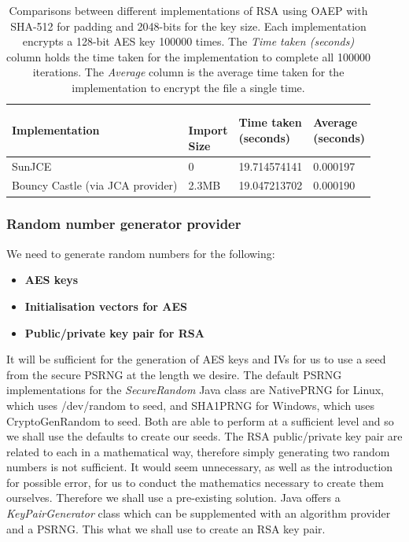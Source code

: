 \documentclass[12pt, titlepage]{article}
\begin{document}
\begin{center}
\begin{table}[H]
    \begin{tabular}{ | l | l | l | l |}
    \hline
    \textbf{Implementation} & \shortstack{ \\ \textbf{Import} \\ \textbf{Size}} & \shortstack{\textbf{Time taken} \\ \textbf{(seconds)}} & \shortstack{\textbf{Average} \\ \textbf{(seconds)}} \\ \hline
    
    SunJCE & 0 & 19.714574141  & 0.000197 \\ \hline
    
     Bouncy Castle (via JCA provider) & 2.3MB & 19.047213702 & 0.000190 \\ \hline
    
    \end{tabular}
    \caption{Comparisons between different implementations of RSA using OAEP with SHA-512 for padding and 2048-bits for the key size. Each implementation encrypts a 128-bit AES key 100000 times. The \textit{Time taken (seconds)} column holds the time taken for the implementation to complete all 100000 iterations. The \textit{Average} column is the average time taken for the implementation to encrypt the file a single time.} \label{tab:rsaComparison}
    \end{table}
\end{center}

\subsubsection{Random number generator provider}
We need to generate random numbers for the following:
\begin{itemize}
	\item \textbf{AES keys}
	\item \textbf{Initialisation vectors for AES}
	\item \textbf{Public/private key pair for RSA}
\end{itemize}
It will be sufficient for the generation of AES keys and IVs for us to use a seed from the secure PSRNG at the length we desire. The default PSRNG implementations for the \textit{SecureRandom} Java class are NativePRNG for Linux, which uses /dev/random to seed, and SHA1PRNG for Windows, which uses CryptoGenRandom to seed. Both are able to perform at a sufficient level and so we shall use the defaults to create our seeds.
\newline \indent The RSA public/private key pair are related to each in a mathematical way, therefore simply generating two random numbers is not sufficient. It would seem unnecessary, as well as the introduction for possible error, for us to conduct the mathematics necessary to create them ourselves. Therefore we shall use a pre-existing solution. Java offers a \textit{KeyPairGenerator} class which can be supplemented with an algorithm provider and a PSRNG. This what we shall use to create an RSA key pair.
\end{document}
